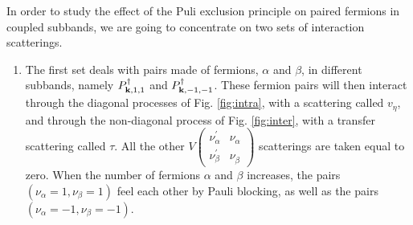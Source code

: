 \documentclass[11pt]{article} %
\begin{document}
In order to study the effect of the Puli exclusion principle on paired fermions in coupled subbands, we are going to concentrate on two sets of interaction scatterings.  
\begin{enumerate}
\item The first set deals with pairs made of fermions, $\alpha$ and $\beta$, in different subbands, namely $P^{\dagger}_{\mathbf{k},1,1}$ and $P^{\dagger}_{\mathbf{k},-1,-1}$. These fermion pairs will then interact through the diagonal processes of Fig. \ref{fig:intra}, with a scattering called $v_{\eta}$, and through the non-diagonal process of Fig. \ref{fig:inter}, with a transfer scattering called $\tau$.  All the other $V 
\left(\begin{smallmatrix}\nu_{\alpha}^{{\prime}}&\nu_{\alpha}^{}\\ \nu_{\beta}^{{\prime}}&\nu_{\beta}^{}\end{smallmatrix}\right)$ scatterings are taken equal to zero.  When the number of fermions $\alpha$ and $\beta$ increases, the pairs $(\nu_{\alpha}=1, \nu_{\beta}=1)$ feel each other by Pauli blocking, as well as the pairs $(\nu_{\alpha}=-1, \nu_{\beta}=-1)$.
\begin{figure}[hhtb]
	\centering
	         \qquad

\end{figure}
\end{enumerate}
\end{document}
